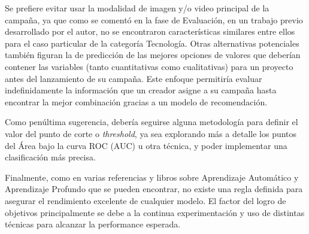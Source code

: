 Se prefiere evitar usar la modalidad de imagen y/o video principal de la campaña, ya que como se comentó en la fase de Evaluación, en un trabajo previo desarrollado por el autor, no se encontraron características similares entre ellos para el caso particular de la categoría Tecnología. Otras alternativas potenciales también figuran la de predicción de las mejores opciones de valores que deberían contener las variables (tanto cuantitativas como cualitativas) para un proyecto antes del lanzamiento de su campaña. Este enfoque permitiría evaluar indefinidamente la información que un creador asigne a su campaña hasta encontrar la mejor combinación gracias a un modelo de recomendación.

Como penúltima sugerencia, debería seguirse alguna metodología para definir el valor del punto de corte o \textit{threshold}, ya sea explorando más a detalle los puntos del Área bajo la curva ROC (AUC) u otra técnica, y poder implementar una clasificación más precisa.

Finalmente, como en varias referencias y libros sobre Aprendizaje Automático y Aprendizaje Profundo que se pueden encontrar, no existe una regla definida para asegurar el rendimiento excelente de cualquier modelo. El factor del logro de objetivos principalmente se debe a la continua experimentación y uso de distintas técnicas para alcanzar la performance esperada.